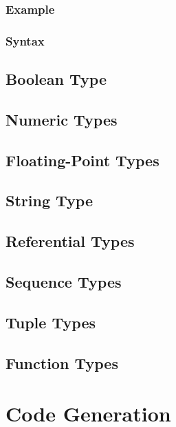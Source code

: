 \documentclass[a4paper,oneside,12pt, extrafontsizes]{memoir}
\begin{document}
    \section{Example}
    

    \section{Syntax}
    

  \chapter{Boolean Type}
  \label{ch:boolean}

  \chapter{Numeric Types}
  \label{ch:numeric-types}

  \chapter{Floating-Point Types}
  \label{ch:floating-point}

  \chapter{String Type}
  \label{ch:string}

  \chapter{Referential Types}
  \label{ch:references}

  \chapter{Sequence Types}
  \label{ch:sequence-types}

  \chapter{Tuple Types}
  \label{ch:tuple-types}

  \chapter{Function Types}
  \label{ch:function-types}

\part{Code Generation}
\end{document}
